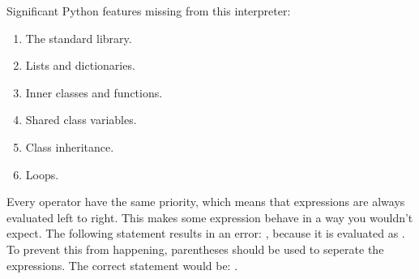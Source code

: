 Significant Python features missing from this interpreter:
\begin{enumerate}
    \item The standard library.
    \item Lists and dictionaries.
    \item Inner classes and functions.
    \item Shared class variables.
    \item Class inheritance.
    \item Loops.
\end{enumerate}
Every operator have the same priority, which means that expressions are always evaluated left to right. This makes some expression behave in a way you wouldn't expect. The following statement results in an error: , because it is evaluated as . To prevent this from happening, parentheses should be used to seperate the expressions. The correct statement would be: .

